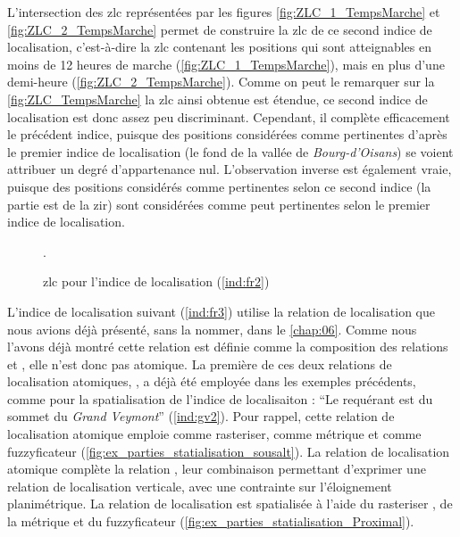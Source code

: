 L'intersection des \ac{zlc} représentées par les figures
\ref{fig:ZLC_1_TempsMarche} et \ref{fig:ZLC_2_TempsMarche} permet de
construire la \ac{zlc} de ce second indice de localisation,
c'est-à-dire la \ac{zlc} contenant les positions qui sont atteignables
en moins de 12 heures de marche (\autoref{fig:ZLC_1_TempsMarche}),
mais en plus d'une demi-heure (\autoref{fig:ZLC_2_TempsMarche}). Comme
on peut le remarquer sur la \autoref{fig:ZLC_TempsMarche} la \ac{zlc}
ainsi obtenue est étendue, ce second indice de localisation est donc
assez peu discriminant. Cependant, il complète efficacement le
précédent indice, puisque des positions considérées comme pertinentes
d'après le premier indice de localisation (\eg le fond de la vallée de
\emph{Bourg-d'Oisans}) se voient attribuer un degré d'appartenance
nul. L'observation inverse est également vraie, puisque des positions
considérés comme pertinentes selon ce second indice (\eg la partie est
de la \ac{zir}) sont considérées comme peut pertinentes selon le
premier indice de localisation.

\begin{figure}[htb]
  \centering
  
  \caption{\ac{zlc} pour l'indice de localisation  (\ref{ind:fr2})}
  \label{fig:ZLC_TempsMarche}.  
\end{figure}


L'indice de localisation suivant (\ref{ind:fr3}) utilise la relation
de localisation  que nous avions déjà
présenté, sans la nommer, dans le \autoref{chap:06}. Comme nous
l'avons déjà montré cette relation est définie comme la composition
des relations  et ,
elle n'est donc pas atomique. La première de ces deux relations de
localisation atomiques, , a déjà été
employée dans les exemples précédents, comme pour la spatialisation de
l'indice de localisaiton : \enquote{Le requérant est
   du sommet du \emph{Grand Veymont}}
(\ref{ind:gv2}). Pour rappel, cette relation de localisation atomique
emploie  comme rasteriser,
 comme métrique et
 comme fuzzyficateur
(\autoref{fig:ex_parties_statialisation_sousalt}). La relation de
localisation atomique  complète la relation
, leur combinaison permettant d'exprimer une
relation de localisation verticale, avec une contrainte sur
l'éloignement planimétrique. La relation de localisation
 est spatialisée à l'aide du rasteriser
, de la métrique
 et du fuzzyficateur
(\autoref{fig:ex_parties_statialisation_Proximal}).

